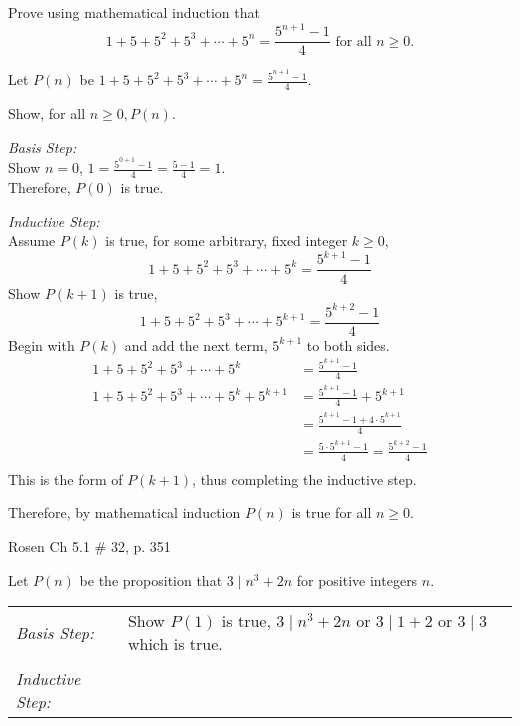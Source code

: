 \begin{questions}
 Prove using mathematical induction that
\[ 1 + 5 + 5^2 + 5^3 + \cdots + 5^n = \frac{5^{n+1} - 1}{4} \text{ for all } n\geq 0. \]
    \ifprintanswers
        \vspace{-10pt}
   \fi
\begin{solution}
    Let $P(n)$ be $1 + 5 + 5^2 + 5^3 + \cdots + 5^n = \frac{5^{n+1} - 1}{4}$.

    \smallskip
    Show, for all $n\geq 0, P(n)$.

    \smallskip
    \textit{Basis Step:}\\ Show $n=0$, $1 = \frac{5^{0+1} - 1}{4} = \frac{5-1}{4} = 1.$ \\
    Therefore, $P(0)$ is true.

    \smallskip
    \textit{Inductive Step:} \\
    Assume $P(k)$ is true, for some arbitrary, fixed integer $k \geq 0$,
       \[ 1 + 5 + 5^2 + 5^3 + \cdots + 5^k = \frac{5^{k+1} - 1}{4} \]
    Show $P(k+1)$ is true,
      \[ 1 + 5 + 5^2 + 5^3 + \cdots + 5^{k+1} = \frac{5^{k+2} - 1}{4} \]
    Begin with $P(k)$ and add the next term, $5^{k+1}$ to both sides.
    \begin{align*}
        1 + 5 + 5^2 + 5^3 + \cdots + 5^k &= \frac{5^{k+1} - 1}{4} \\
        1 + 5 + 5^2 + 5^3 + \cdots + 5^k  + 5^{k+1} &= \frac{5^{k+1} - 1}{4} + 5^{k+1} \\
          &= \frac{5^{k+1} - 1 + 4\cdot 5^{k+1}}{4} \\
          &= \frac{5\cdot 5^{k+1} - 1}{4} = \frac{5^{k+2} - 1}{4} \\
    \end{align*}
    This is the form of $P(k+1)$, thus completing the inductive step.

    Therefore, by mathematical induction $P(n)$ is true for all $n \geq 0$.
\end{solution}



 Rosen Ch 5.1 \# 32, p. 351
    \ifprintanswers
        \vspace{-10pt}
   \fi
\begin{solution}
Let $P(n)$ be the proposition that $3 \;|\; n^3 + 2n$ for positive integers $n$.

\smallskip
\begin{tabular}{ll}
  \textit{Basis Step:} & Show $P(1)$ is true, $3 \;|\; n^3 + 2n$ or $3 \;|\; 1 + 2$ or $3 \;|\; 3$ which is true. \\
   & \\
 \textit{Inductive Step:} &  \\
\end{tabular}


\end{solution}
\end{questions}
